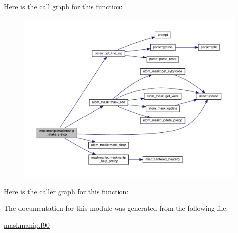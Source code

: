 Here is the call graph for this function\-:
\nopagebreak
\begin{figure}[H]
\begin{center}
\leavevmode
\includegraphics[width=350pt]{classmaskmanip_aa7d710d064627916cae7417ab446621c_cgraph}
\end{center}
\end{figure}




Here is the caller graph for this function\-:




The documentation for this module was generated from the following file\-:\begin{DoxyCompactItemize}
\item 
\hyperlink{maskmanip_8f90}{maskmanip.\-f90}\end{DoxyCompactItemize}
